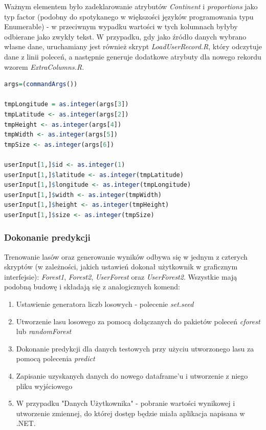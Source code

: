 \documentclass[a4paper,twoside]{article}
\begin{document}
Ważnym elementem było zadeklarowanie atrybutów \textit{Continent} i \textit{proportions} jako typ factor (podobny do spotykanego w większości języków programowania typu Enumerable) - w przeciwnym wypadku wartości w tych kolumnach byłyby odbierane jako zwykły tekst. W przypadku, gdy jako źródło danych wybrano własne dane, uruchamiany jest również skrypt \textit{LoadUserRecord.R}, który odczytuje dane z linii poleceń, a następnie generuje dodatkowe atrybuty dla nowego rekordu wzorem \textit{ExtraColumns.R}. \\

\begin{lstlisting}[language=R]
args=(commandArgs())

tmpLongitude = as.integer(args[3])
tmpLatitude <- as.integer(args[2])
tmpHeight <- as.integer(args[4])
tmpWidth <- as.integer(args[5])
tmpSize <- as.integer(args[6])

userInput[1,]$id <- as.integer(1)
userInput[1,]$latitude <- as.integer(tmpLatitude)
userInput[1,]$longitude <- as.integer(tmpLongitude)
userInput[1,]$width <- as.integer(tmpWidth)
userInput[1,]$height <- as.integer(tmpHeight)
userInput[1,]$size <- as.integer(tmpSize)
\end{lstlisting}

\newpage

\subsubsection{Dokonanie predykcji}

Trenowanie lasów oraz generowanie wyników odbywa się w jednym z czterych skryptów (w zależności, jakich ustawień dokonał użytkownik w graficznym interfejsie): \textit{Forest1}, \textit{Forest2}, \textit{UserForest} oraz \textit{UserForest2}. Wszystkie mają podobną budowę i składają się z analogicznych komend:

\begin{enumerate}
	\item Ustawienie generatora liczb losowych - polecenie \textit{set.seed}
	\item Utworzenie lasu losowego za pomocą dołączanych do pakietów poleceń \textit{cforest} lub \textit{randomForest}
	\item Dokonanie predykcji dla danych testowych przy użyciu utworzonego lasu za pomocą polecenia \textit{predict}
	\item Zapisanie uzyskanych danych do nowego dataframe'u i utworzenie z niego pliku wyjściowego
	\item W przypadku "Danych Użytkownika" - pobranie wartości wynikowej i utworzenie zmiennej, do której dostęp będzie miała aplikacja napisana w .NET.
\end{enumerate}
\end{document}
